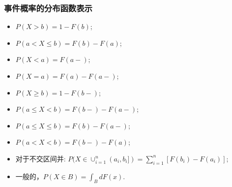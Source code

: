 \documentclass[Prob-All.tex]{subfiles}
\begin{document}
\begin{frame}
	\frametitle{事件概率的分布函数表示}
	\begin{itemize}[<+-|alert@+>]
		\item $P(X> b)=1-F(b)$;%
		\item $P(a< X\le b)=F(b)-F(a)$;%

		\item $P(X<a)=F(a-)$;%

		\item $P(X=a)=F(a)-F(a-)$;%
		\item $P(X\ge b)=1-F(b-)$;%

		\item $P(a\le X<b)=F(b-)-F(a-)$;%
		\item $P(a\le X\le b)=F(b)-F(a-)$;%
		\item $P(a< X<b)=F(b-)-F(a)$;%
		\item 对于不交区间并: %
		$P (X\in \cup_{i=1}^n (a_i,b_i])=\sum_{i=1}^n [F (b_i)-F (a_i)]$;%
		\item 一般的，$P (X\in B)=\int_BdF (x)$.
	\end{itemize}
\end{frame}
\end{document}
